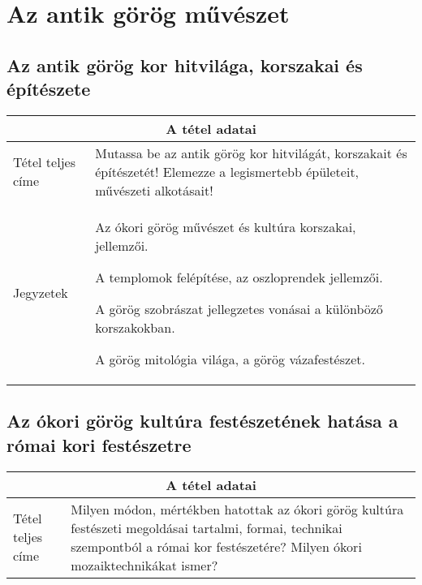 \chapter{Az antik görög művészet}
\label{ch:2_antik_gorog}

\section{Az antik görög kor hitvilága, korszakai és építészete}

\begin{center}
	\begin{longtable}{ | p{} | p{} | }
		
		\hline
		\multicolumn{2}{|c|}{\textbf{A tétel adatai}}
		\\ \hline
		
		\hline
		Tétel teljes címe & Mutassa be az antik görög kor hitvilágát, korszakait és építészetét! Elemezze a legismertebb épületeit, művészeti alkotásait!
		\\ \hline
		
		Jegyzetek &
		\begin{compactitem}
			\item Az ókori görög művészet és kultúra korszakai, jellemzői.
			\item A templomok felépítése, az oszloprendek jellemzői.
			\item A görög szobrászat jellegzetes vonásai a különböző korszakokban.
			\item A görög mitológia világa, a görög vázafestészet.
		\end{compactitem}
		\\\hline
		
	\end{longtable}
\end{center}

\cleardoublepage

\section{Az ókori görög kultúra festészetének hatása a római kori festészetre}

\begin{center}
	\begin{longtable}{ | p{} | p{} | }
		
		\hline
		\multicolumn{2}{|c|}{\textbf{A tétel adatai}}
		\\ \hline
		
		\hline
		Tétel teljes címe &
		Milyen módon, mértékben hatottak az ókori görög kultúra festészeti megoldásai tartalmi, formai, technikai szempontból a római kor festészetére? Milyen ókori mozaiktechnikákat ismer?
		\\ \hline
		
	\end{longtable}
\end{center}
